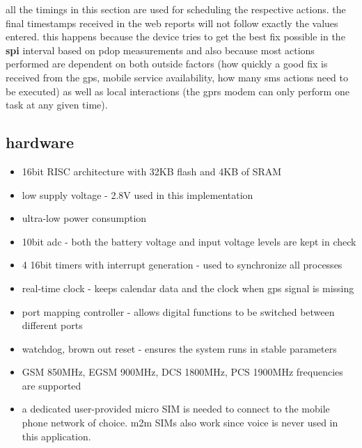 \documentclass[a4paper,twoside]{refart}
\begin{document}
all the timings in this section are used for scheduling the respective actions. the final timestamps received in the web reports will not follow exactly the values entered. this happens because the device tries to get the best fix possible in the \textbf{spi} interval based on \gls{pdop} measurements and also because most actions performed are dependent on both outside factors (how quickly a good fix is received from the gps, mobile service availability, how many sms actions need to be executed) as well as local interactions (the gprs modem can only perform one task at any given time).

\newpage
\subsection{hardware}

    \begin{itemize}
        \item 16bit RISC architecture with 32KB flash and 4KB of SRAM
        \item low supply voltage - 2.8V used in this implementation
        \item ultra-low power consumption
        \item 10bit \gls{adc} - both the battery voltage and input voltage levels are kept in check
        \item 4 16bit timers with interrupt generation - used to synchronize all processes
        \item real-time clock - keeps calendar data and the clock when gps signal is missing
        \item port mapping controller - allows digital functions to be switched between different ports
        \item watchdog, brown out reset - ensures the system runs in stable parameters
    \end{itemize}

    \begin{itemize}
        \item GSM 850MHz, EGSM 900MHz, DCS 1800MHz, PCS 1900MHz frequencies are supported
        \item a dedicated user-provided micro SIM is needed to connect to the mobile phone network of choice. \gls{m2m} SIMs also work since voice is never used in this application.
    \end{itemize}
\end{document}
